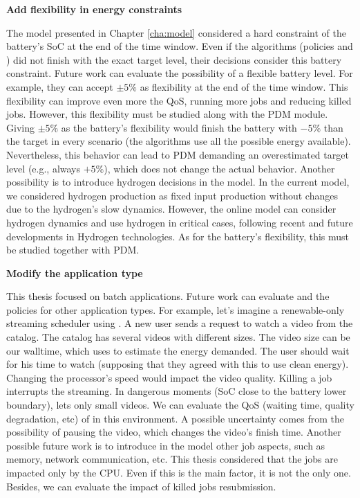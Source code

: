 \textbf{Add flexibility in energy constraints}

The model presented in Chapter \ref{cha:model} considered a hard constraint of the battery's SoC at the end of the time window. Even if the algorithms (policies and \emph{\systemName}) did not finish with the exact target level, their decisions consider this battery constraint. Future work can evaluate the possibility of a flexible battery level. For example, they can accept $\pm 5\%$ as flexibility at the end of the time window. This flexibility can improve even more the QoS, running more jobs and reducing killed jobs. However, this flexibility must be studied along with the PDM module. Giving $\pm 5\%$ as the battery's flexibility would finish the battery with $-5\%$ than the target in every scenario (the algorithms use all the possible energy available). Nevertheless, this behavior can lead to PDM demanding an overestimated target level (e.g., always $+5\%$), which does not change the actual behavior. Another possibility is to introduce hydrogen decisions in the model. In the current model, we considered hydrogen production as fixed input production without changes due to the hydrogen's slow dynamics. However, the online model can consider hydrogen dynamics and use hydrogen in critical cases, following recent and future developments in Hydrogen technologies. As for the battery's flexibility, this must be studied together with PDM.

\textbf{Modify the application type}

This thesis focused on batch applications. Future work can evaluate \emph{\systemName} and the policies for other application types. For example, let's imagine a renewable-only streaming scheduler using \emph{\systemName}. A new user sends a request to watch a video from the catalog. The catalog has several videos with different sizes. The video size can be our walltime, which \emph{\systemName} uses to estimate the energy demanded. The user should wait for his time to watch (supposing that they agreed with this to use clean energy). Changing the processor's speed would impact the video quality. Killing a job interrupts the streaming. In dangerous moments (SoC close to the battery lower boundary), \emph{\systemName} lets only small videos. We can evaluate the QoS (waiting time, quality degradation, etc) of \emph{\systemName} in this environment. A possible uncertainty comes from the possibility of pausing the video, which changes the video's finish time. Another possible future work is to introduce in the model other job aspects, such as memory, network communication, etc. This thesis considered that the jobs are impacted only by the CPU. Even if this is the main factor, it is not the only one. Besides, we can evaluate the impact of killed jobs resubmission.

